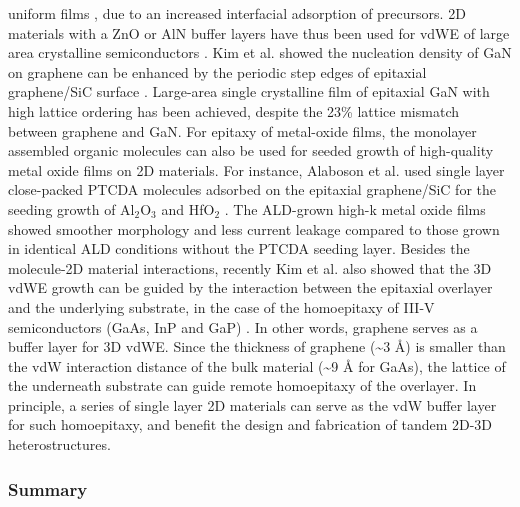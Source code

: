 uniform films
\cite{Dlubak_2012_gr_sub_assist_Al2O3,Vaziri_2013_ALD_Al2O3_gr,Zhang_2014_Al2O3_ALO_Gr,Chung_2010_GaN_ZnO_gr,Oh_2014_ZnO_hBN,Zhang_2011_TiO2_gr,Kumar_2011_gr_TiO2_generator,Li_2015_TiO2_GO},
due to an increased interfacial adsorption of precursors. 2D materials
with a ZnO or AlN buffer layers have thus been used for vdWE of large
area crystalline semiconductors
\cite{Chung_2010_GaN_ZnO_gr,Yoo_2013_GaN_gr_defect,Nepal_2013_GaN_gr,Kobayashi_2012_GaN_hBN}. Kim
et al. showed the nucleation density of GaN on graphene can be
enhanced by the periodic step edges of epitaxial graphene/SiC surface
\cite{Kim_2014_direct_vdw_GaN_gr}. Large-area single crystalline film of
epitaxial GaN with high lattice ordering has been achieved, despite
the 23\% lattice mismatch between graphene and GaN. For epitaxy of
metal-oxide films, the monolayer assembled organic molecules can also
be used for seeded growth of high-quality metal oxide films on 2D
materials. For instance, Alaboson et al. used single layer
close-packed PTCDA molecules adsorbed on the epitaxial graphene/SiC
for the seeding growth of Al\(_{\text{2}}\)O\(_{\text{3}}\) and HfO\(_{\text{2}}\)
\cite{Alaboson_2011_PTCDA_gr_ALD}. The ALD-grown high-k metal oxide
films showed smoother morphology and less current leakage compared to
those grown in identical ALD conditions without the PTCDA seeding
layer. Besides the molecule-2D material interactions, recently Kim et
al. also showed that the 3D vdWE growth can be guided by the
interaction between the epitaxial overlayer and the underlying
substrate, in the case of the homoepitaxy of III-V semiconductors
(GaAs, InP and GaP) \cite{Kim_2017_remote_epi_Gr}. In other words,
graphene serves as a buffer layer for 3D vdWE. Since the thickness of
graphene (\textasciitilde{}3 \AA{}) is smaller than the vdW interaction distance of the
bulk material (\textasciitilde{}9 \AA{} for GaAs), the lattice of the underneath
substrate can guide remote homoepitaxy of the overlayer. In principle,
a series of single layer 2D materials can serve as the vdW buffer
layer for such homoepitaxy, and benefit the design and fabrication of
tandem 2D-3D heterostructures.


\subsubsection{Summary}
\label{sec:org0b4290f}

